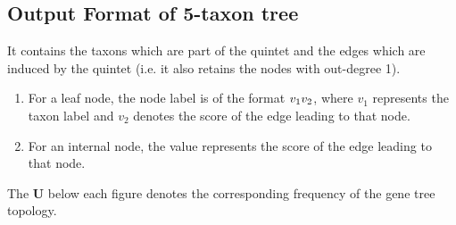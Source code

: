 \documentclass[letterpaper, 12pt]{article}
\begin{document}
\begin{comment}
 
 \subsection{ Output Format  of original tree}
 This is mainly for debugging purpose. It shows the order of the edges in the post order integration and prints the free for each replicate of each model condition.
 \begin{enumerate}
 \item For an internal node, if only one value is present, then the value represents the index of the edge leading to that node in the post order iteration.
 \item For an internal node, if two values are present like $v_1\/v_2$, then the $v_1$ represents the index of the edge leading to that node in the post order iteration and $v_2$ denotes the score of that edge.
  \item For a leaf node edge, if two values are present like $v_1\/v_2$, then the taxon label and  the index of the edge leading to that node in the post order iteration are represented by  $v_1$  and $v_2$ respectively. It means the taxon is not included in the quintet.
 \item For a leaf node edge, if three values are present like $v_1\/v_2\/v_3$, then the taxon label,  index of the edge leading to that node in the post order iteration and score of that edge are represented by  $v_1$ ,$v_2$ and $v_3$ respectively. 

  \end{enumerate}
\end{comment}
 
 \subsection { Output Format  of 5-taxon tree}
 
 It contains the taxons which are part of the quintet and the edges which are induced by the quintet (i.e. it also retains the nodes with out-degree 1).
 \begin{enumerate}
 \item For a leaf node, the node label is of the format $v_1\/v_2$,  where $v_1$ represents the taxon label and $v_2$  denotes the score of the edge leading to that node.
  \item For an internal node, the value represents the score of the edge leading to that node.
  \end{enumerate}
  
  The {\bf U }  below each figure denotes the corresponding frequency of the gene tree topology.
  
\end{document}
